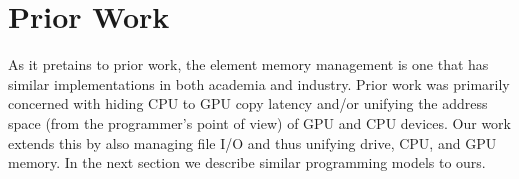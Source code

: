 \section{Prior Work}

As it pretains to prior work, the element memory management
	is one that has similar implementations in both academia
	and industry.
Prior work was primarily concerned with hiding CPU
	to GPU copy latency \cite{gmac} and/or unifying the 
	address space (from the programmer's point of view)
	of GPU and CPU devices.
Our work extends this by also managing file I/O and thus
	unifying drive, CPU, and GPU memory.
In the next section we describe similar programming models
	to ours.
